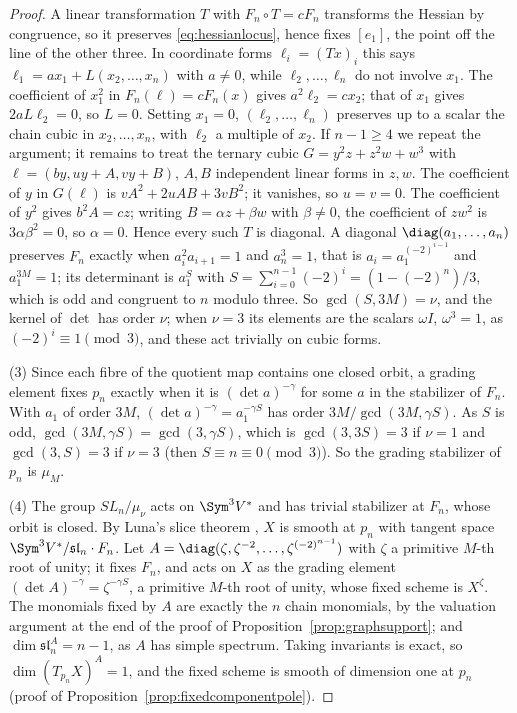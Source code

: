 \begin{proof}
A linear transformation $T$ with $F_n\circ T=cF_n$ transforms the Hessian by
congruence, so it preserves \eqref{eq:hessianlocus}, hence fixes $[e_1]$, the
point off the line of the other three. In coordinate forms $\ell_i=(Tx)_i$
this says $\ell_1=ax_1+L(x_2,\dots,x_n)$ with $a\ne0$, while $\ell_2,\dots,
\ell_n$ do not involve $x_1$. The coefficient of $x_1^2$ in
$F_n(\ell)=cF_n(x)$ gives $a^2\ell_2=cx_2$; that of $x_1$ gives $2aL\ell_2=0$,
so $L=0$. Setting $x_1=0$, $(\ell_2,\dots,\ell_n)$ preserves up to a scalar the
chain cubic in $x_2,\dots,x_n$, with $\ell_2$ a multiple of $x_2$. If $n-1\ge4$
we repeat the argument; it remains to treat the ternary cubic
$G=y^2z+z^2w+w^3$ with $\ell=(by,uy+A,vy+B)$, $A,B$ independent linear forms
in $z,w$. The coefficient of $y$ in $G(\ell)$ is $vA^2+2uAB+3vB^2$; it
vanishes, so $u=v=0$. The coefficient of $y^2$ gives $b^2A=cz$; writing
$B=\alpha z+\beta w$ with $\beta\ne0$, the coefficient of $zw^2$ is
$3\alpha\beta^2=0$, so $\alpha=0$. Hence every such $T$ is diagonal. A
diagonal $\diag(a_1,\dots,a_n)$ preserves $F_n$ exactly when $a_i^2a_{i+1}=1$
and $a_n^3=1$, that is $a_i=a_1^{(-2)^{i-1}}$ and $a_1^{3M}=1$; its
determinant is $a_1^S$ with $S=\sum_{i=0}^{n-1}(-2)^i=(1-(-2)^n)/3$, which is
odd and congruent to $n$ modulo three. So $\gcd(S,3M)=\nu$, and the kernel of
$\det$ has order $\nu$; when $\nu=3$ its elements are the scalars
$\omega I$, $\omega^3=1$, as $(-2)^i\equiv1\pmod3$, and these act trivially on
cubic forms.

(3) Since each fibre of the quotient map contains one closed orbit, a grading
element fixes $p_n$ exactly when it is $(\det a)^{-\gamma}$ for some $a$ in the
stabilizer of $F_n$. With $a_1$ of order $3M$, $(\det a)^{-\gamma}=
a_1^{-\gamma S}$ has order $3M/\gcd(3M,\gamma S)$. As $S$ is odd,
$\gcd(3M,\gamma S)=\gcd(3,\gamma S)$, which is $\gcd(3,3S)=3$ if $\nu=1$ and
$\gcd(3,S)=3$ if $\nu=3$ (then $S\equiv n\equiv0\pmod3$). So the grading
stabilizer of $p_n$ is $\mu_M$.

(4) The group $SL_n/\mu_\nu$ acts on $\Sym^3V^*$ and has trivial stabilizer at
$F_n$, whose orbit is closed. By Luna's slice theorem \cite[Section III.1,
Th\'eor\`eme du slice \'etale and Remarque 1$^\circ$, pp.~97--98]{Luna}, $X$ is smooth at $p_n$ with tangent space
$\Sym^3V^*/\mathfrak{sl}_n\cdot F_n$. Let $A=\diag(\zeta,\zeta^{-2},\dots,
\zeta^{(-2)^{n-1}})$ with $\zeta$ a primitive $M$-th root of unity; it fixes
$F_n$, and acts on $X$ as the grading element $(\det A)^{-\gamma}=\zeta^{-\gamma
S}$, a primitive $M$-th root of unity, whose fixed scheme is $X^\zeta$. The
monomials fixed by $A$ are exactly the $n$ chain monomials, by the valuation
argument at the end of the proof of Proposition~\ref{prop:graphsupport}; and
$\dim\mathfrak{sl}_n^A=n-1$, as $A$ has simple spectrum. Taking invariants is
exact, so $\dim(T_{p_n}X)^A=1$, and the fixed scheme is smooth of dimension one
at $p_n$ (proof of Proposition~\ref{prop:fixedcomponentpole}).
\end{proof}

